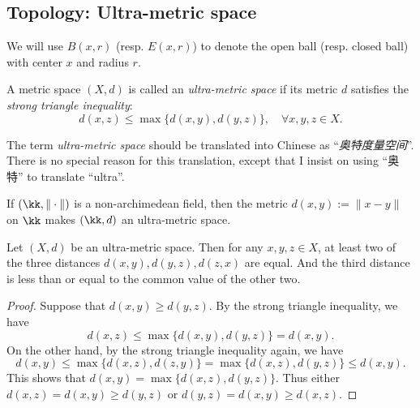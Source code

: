 
\subsection{Topology: Ultra-metric space}

    We will use \(B(x,r)\) (resp. \(E(x,r)\)) to denote the open ball (resp. closed ball) with center \(x\) and radius \(r\).

    \begin{definition}\label{def:ultra-metric_space}
        A metric space \((X,d)\) is called an \emph{ultra-metric space} if its metric \(d\) satisfies the \emph{strong triangle inequality}:
        \[ d(x,z) \leq \max\{d(x,y), d(y,z)\},\quad\forall x,y,z\in X. \]
    \end{definition}

    \begin{remark}\label{rmk:Chinese_translation_of_ultra-metric_space}
        The term \emph{ultra-metric space} should be translated into Chinese as ``\emph{奥特度量空间}''.
        There is no special reason for this translation, except that I insist on using ``奥特'' to translate ``ultra''.
    \end{remark}

    If \((\kk,\|\cdot\|)\) is a non-archimedean field, then the metric \(d(x,y) := \|x-y\|\) on \(\kk\) makes \((\kk,d)\) an ultra-metric space.

    \begin{proposition}\label{prop:all_triangles_in_ultra-metric_space_are_isosceles}
        Let \((X,d)\) be an ultra-metric space.
        Then for any \(x,y,z \in X\), at least two of the three distances \(d(x,y), d(y,z), d(z,x)\) are equal.
        And the third distance is less than or equal to the common value of the other two.
    \end{proposition}
    \begin{proof}
        Suppose that \(d(x,y) \geq d(y,z)\).
        By the strong triangle inequality, we have
        \[ d(x,z) \leq \max\{d(x,y), d(y,z)\} = d(x,y). \]
        On the other hand, by the strong triangle inequality again, we have
        \[ d(x,y) \leq \max\{d(x,z), d(z,y)\} = \max\{d(x,z), d(y,z)\} \leq d(x,y). \]
        This shows that \(d(x,y) = \max\{d(x,z), d(y,z)\}\).
        Thus either \(d(x,z) = d(x,y) \geq d(y,z)\) or \(d(y,z) = d(x,y) \geq d(x,z)\).
    \end{proof}


